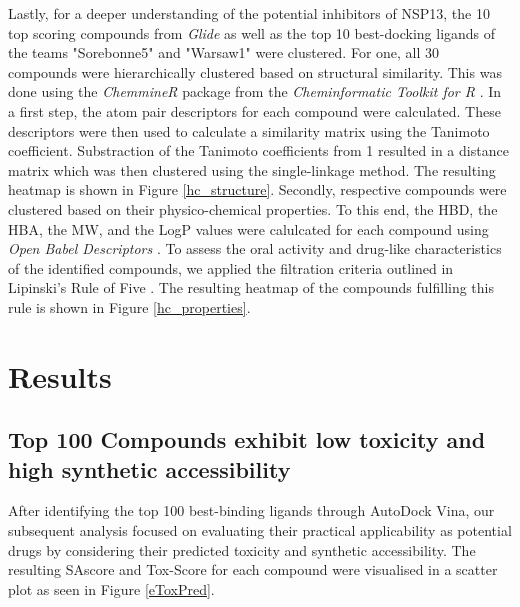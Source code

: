 \documentclass[11pt, letterpaper, titlepage]{article}
\begin{document}
Lastly, for a deeper understanding of the potential inhibitors of \ac{NSP13}, the 10 top scoring compounds from \textit{Glide} as well as the top 10 best-docking ligands of the teams "Sorebonne5" and "Warsaw1" were clustered. For one, all 30 compounds were hierarchically clustered based on structural similarity. This was done using the \textit{ChemmineR} package from the \textit{Cheminformatic Toolkit for R} \cite{ChemmineR}. In a first step, the atom pair descriptors for each compound were calculated. These descriptors were then used to calculate a similarity matrix using the Tanimoto coefficient. Substraction of the Tanimoto coefficients from 1 resulted in a distance matrix which was then clustered using the single-linkage method. The resulting heatmap is shown in Figure \ref{hc_structure}.
Secondly, respective compounds were clustered based on their physico-chemical properties. To this end, the \ac{HBD}, the \ac{HBA}, the \ac{MW}, and the \ac{LogP} values were calulcated for each compound using \textit{Open Babel Descriptors} \cite{}. To assess the oral activity and drug-like characteristics of the identified compounds, we applied the filtration criteria outlined in Lipinski's Rule of Five \cite{Lipinski_1997}. The resulting heatmap of the compounds fulfilling this rule is shown in Figure \ref{hc_properties}.  

\section{Results}
\subsection{Top 100 Compounds exhibit low toxicity and high synthetic accessibility}
After identifying the top 100 best-binding ligands through AutoDock Vina, our subsequent analysis focused on evaluating their practical applicability as potential drugs by considering their predicted toxicity and synthetic accessibility. The resulting SAscore and Tox-Score for each compound were visualised in a scatter plot as seen in {Figure \ref{eToxPred}}. 
\end{document}

